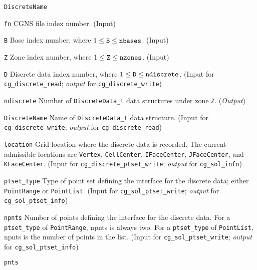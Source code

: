 \begin{Ventryi}{\texttt{DiscreteName}}\raggedright
\item [\texttt{fn}]
      CGNS file index number.
      (\textcolor{input}{Input})
\item [\texttt{B}]
      Base index number, where $1 \leq \text{\texttt{B}} \leq \text{\texttt{nbases}}$.
      (\textcolor{input}{Input})
\item [\texttt{Z}]
      Zone index number, where $1 \leq \text{\texttt{Z}} \leq \text{\texttt{nzones}}$.
      (\textcolor{input}{Input})
\item [\texttt{D}]
      Discrete data index number, where $1 \leq \text{\texttt{D}} \leq \text{\texttt{ndiscrete}}$.
      (\textcolor{input}{Input} for \texttt{cg\_discrete\_read};
      \textcolor{output}{\textit{output}} for \texttt{cg\_discrete\_write})
\item [\texttt{ndiscrete}]
      Number of \texttt{DiscreteData\_t} data structures under zone \texttt{Z}.
      (\textcolor{output}{\textit{Output}})
\item [\texttt{DiscreteName}]
      Name of \texttt{DiscreteData\_t} data structure.
      (\textcolor{input}{Input} for \texttt{cg\_discrete\_write};
      \textcolor{output}{\textit{output}} for \texttt{cg\_discrete\_read})
\item [\texttt{location}]
      Grid location where the discrete data is recorded.
      The current admissible locations are \texttt{Vertex},
      \texttt{CellCenter}, \texttt{IFaceCenter}, \texttt{JFaceCenter},
      and \texttt{KFaceCenter}.
      (\textcolor{input}{Input} for \texttt{cg\_discrete\_ptset\_write};
      \textcolor{output}{\textit{output}} for \texttt{cg\_sol\_info})
\item [\texttt{ptset\_type}]
      Type of point set defining the interface for the discrete data;
      either \texttt{PointRange} or \texttt{PointList}.
      (\textcolor{input}{Input} for \texttt{cg\_sol\_ptset\_write};
      \textcolor{output}{\textit{output}} for
      \texttt{cg\_sol\_ptset\_info})
\item [\texttt{npnts}]
      Number of points defining the interface for the discrete data.
      For a \texttt{ptset\_type} of \texttt{PointRange}, npnts
      is always two. For a \texttt{ptset\_type} of \texttt{PointList},
      npnts is the number of points in the list. 
      (\textcolor{input}{Input} for \texttt{cg\_sol\_ptset\_write};
      \textcolor{output}{\textit{output}} for
      \texttt{cg\_sol\_ptset\_info})
\item [\texttt{pnts}]

\end{Ventryi}
